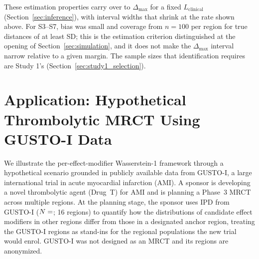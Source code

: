 \documentclass[AMA,Times1COL]{WileyNJDv5}
\begin{document}

These estimation properties carry over to $\Delta_{\max}$ for a fixed $L_{\text{clinical}}$ (Section~\ref{sec:inference}), with interval widths that shrink at the rate shown above. For S3--S7, bias was small and coverage  from $n = 100$ per region for true distances of at least  SD; this is the estimation criterion distinguished at the opening of Section~\ref{sec:simulation}, and it does not make the $\Delta_{\max}$ interval narrow relative to a given margin. The sample sizes that identification requires are Study 1's (Section~\ref{sec:study1_selection}).

\section{Application: Hypothetical Thrombolytic MRCT Using GUSTO-I Data}\label{sec:application}

We illustrate the per-effect-modifier Wasserstein-1 framework through a hypothetical scenario grounded in publicly available data from GUSTO-I, a large international trial in acute myocardial infarction (AMI). A sponsor is developing a novel thrombolytic agent (Drug~T) for AMI and is planning a Phase~3 MRCT across multiple regions. At the planning stage, the sponsor uses IPD from GUSTO-I ($N = \numval{gustoN}$; 16 regions)\cite{gusto1993} to quantify how the distributions of candidate effect modifiers in other regions differ from those in a designated anchor region, treating the GUSTO-I regions as stand-ins for the regional populations the new trial would enrol. GUSTO-I was not designed as an MRCT and its regions are anonymized.
\end{document}
